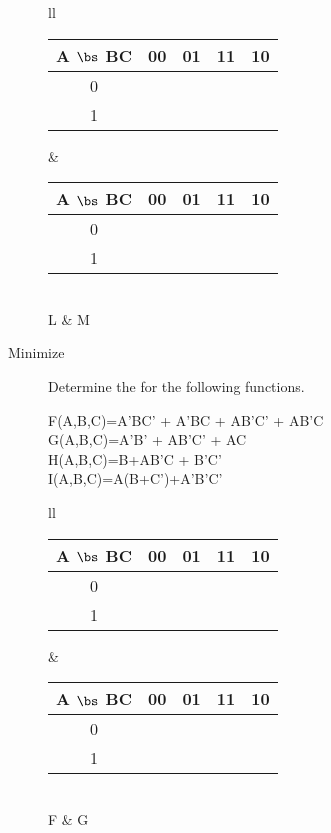 \begin{description}
\begin{tabular}{ll}
	\begin{tabular} {c||c|c|c|c}
      A $\bs$ BC & 00 & 01 & 11 & 10 \\ \hline \hline
        0        &    &    &    &    \\ \hline
        1        &    &    &    &    \\
	\end{tabular}		&
	\begin{tabular} {c||c|c|c|c}
      A $\bs$ BC & 00 & 01 & 11 & 10 \\ \hline \hline
        0        &    &    &    &    \\ \hline
        1        &    &    &    &    \\
	\end{tabular}		\\
	L & M \vspace{0.3in}\\ 
    \end{tabular}

\pagebreak

\item[Minimize] Determine the \SOPmin for the following functions.

\begin{description}
\item[F(A,B,C)=A'BC' + A'BC + AB'C' + AB'C]
\item[G(A,B,C)=A'B' + AB'C' + AC]
\item[H(A,B,C)=B+AB'C + B'C']
\item[I(A,B,C)=A(B+C')+A'B'C']
\end{description}

    \begin{tabular}{ll} 
	\begin{tabular} {c||c|c|c|c}
      A $\bs$ BC & 00 & 01 & 11 & 10 \\ \hline \hline
        0        &    &    &    &    \\ \hline
        1        &    &    &    &    \\
	\end{tabular}		&
	\begin{tabular} {c||c|c|c|c}
      A $\bs$ BC & 00 & 01 & 11 & 10 \\ \hline \hline
        0        &    &    &    &    \\ \hline
        1        &    &    &    &    \\
	\end{tabular}		\\
	F & G \vspace{0.2in}\\ 


\end{tabular}
\end{description}
